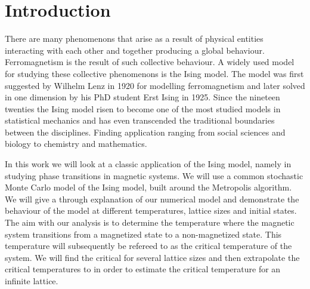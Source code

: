 \section{Introduction}
There are many phenomenons that arise as a result of physical entities
interacting with each other and together producing a global behaviour.
Ferromagnetism is the result of such collective behaviour. A widely used model
for studying these collective phenomenons is the Ising model.
The model was first suggested by Wilhelm Lenz in 1920 for modelling
ferromagnetism and later solved 
in one dimension by his PhD student Erst Ising in 1925. Since the nineteen
twenties the Ising model risen to become one of the most studied models in
statistical mechanics and has even
transcended the traditional boundaries between the disciplines. Finding
application ranging from social sciences and biology to chemistry and
mathematics.

In this work we will look at a classic application of the Ising model, namely
in studying phase transitions in magnetic systems. We will use a common
stochastic Monte Carlo model of the Ising model, built around the Metropolis algorithm. We will give a through explanation of our numerical model
and demonstrate the behaviour of the model at different temperatures, lattice
sizes and initial states. The aim with our analysis is to determine the
temperature where the magnetic system transitions from a 
magnetized state to a non-magnetized state. This
temperature will subsequently be refereed to as the critical
temperature of the system. We will find the critical for several lattice sizes
and then extrapolate the critical temperatures to in order to estimate the
critical temperature for an infinite lattice.



